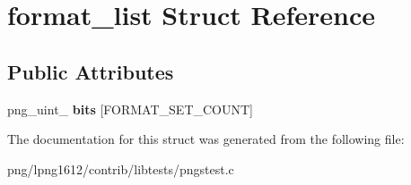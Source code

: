 \hypertarget{structformat__list}{\section{format\+\_\+list Struct Reference}
\label{structformat__list}
}
\subsection*{Public Attributes}
\begin{DoxyCompactItemize}
\item 
\hypertarget{structformat__list_a368a05bb5e776932aea3d4f65f731483}{png\+\_\+uint\+\_ {\bfseries bits} \mbox{[}F\+O\+R\+M\+A\+T\+\_\+\+S\+E\+T\+\_\+\+C\+O\+U\+N\+T\mbox{]}}\label{structformat__list_a368a05bb5e776932aea3d4f65f731483}

\end{DoxyCompactItemize}


The documentation for this struct was generated from the following file\+:\begin{DoxyCompactItemize}
\item 
png/lpng1612/contrib/libtests/pngstest.\+c\end{DoxyCompactItemize}
